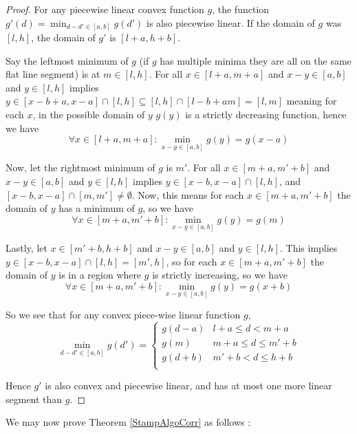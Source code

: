 \documentclass{article}
\newcounter{cases}
\theoremstyle{Definition}
\theoremstyle{definition}
\begin{document}
\begin{proof}
	For any piecewise linear convex function $g$, the function $g'(d) = \min_{d-d' \in [a,b]} g(d')$ is also piecewise linear. 
	If the domain of $g$ was $[l, h]$, the domain of $g'$ is $[l + a, h + b]$. 
	
	Say the leftmost minimum of $g$ (if $g$ has multiple minima they are all on the same flat line segment) is at $m \in [l,h]$. 
	For all $x \in [l + a, m+ a] $ and $x - y \in [a, b]$ and $y \in [l,h]$ implies $y \in [x-b+a, x-a] \cap [l, h] \subseteq [l, h] \cap [l-b+a m] = [l,m]$ meaning for each $x$, in the possible domain of $y$ $g(y)$ is a strictly decreasing function, hence  we have $$\forall x \in [l + a, m+ a] : \min_{x - y \in [a,b]} g(y) = g(x - a) $$
	
	Now, let the rightmost minimum of $g$ is $m'$. 
	For all $x \in [m + a, m' + b] $ and $x - y \in [a, b]$ and $y \in [l,h]$ implies $y \in [x-b, x-a] \cap [l, h]$, and $[x - b, x - a] \cap [m, m'] \neq \emptyset$. 
	Now, this means for each $x \in [m+a, m' + b]$ the domain of $y$ has a minimum of $g$, so we have $$\forall x \in [m + a, m'+ b] : \min_{x - y \in [a,b]} g(y) = g(m) $$
	
	Lastly, let  $x \in [m' + b, h + b] $ and $x - y \in [a, b]$ and $y \in [l,h]$. 
	This implies $y \in [x-b, x-a] \cap [l, h] = [m', h]$, so for each $x \in [m+a, m' + b]$ the domain of $y$ is in a region where $g$ is strictly increasing, so we have $$\forall x \in [m + a, m'+ b] : \min_{x - y \in [a,b]} g(y) = g(x+b) $$
	
	So we see that for any convex piece-wise linear function $g$, $$\min_{d-d' \in [a,b]} g(d') = \begin{cases}
		g(d-a) & l + a \leq d < m + a \\
		g(m) & m+a \leq d \leq m' + b \\
		g(d+b) & m' + b < d \leq h + b   \\
	\end{cases}$$
	
	Hence $g'$ is also convex and piecewise linear, and has at most one more linear segment than $g$. 
\end{proof}

We may now prove Theorem \ref{StampAlgoCorr} as follows : 
\end{document}
